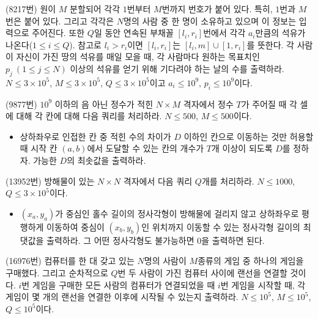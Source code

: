 \begin{problem}
    (8217번) 원이 $M$ 분할되어 각각 $1$번부터 $M$번까지 번호가 붙어 있다. 특히, $1$번과 $M$번은 붙어 있다. 그리고 각각은 $N$명의 사람 중 한 명이 소유하고 있으며 이 정보는 입력으로 주어진다. 또한 $Q$일 동안 연속된 부채꼴 $[l_i, r_i]$번에서 각각 $a_i$만큼의 석유가 나온다($1 \leq i \leq Q$). 참고로 $l_i > r_i$이면 $[l_i, r_i]$는 $[l_i, m] \cup [1, r_i]$를 뜻한다. 각 사람이 자신이 가진 땅의 석유를 매일 모을 때, 각 사람마다 원하는 목표치인 $p_j~(1 \leq j \leq N)$ 이상의 석유를 얻기 위해 기다려야 하는 날의 수를 출력하라. $N \leq 3 \times 10^5$, $M \leq 3 \times 10^5$, $Q \leq 3 \times 10^5$이고 $a_i \leq 10^9$, $p_i \leq 10^9$이다.
\end{problem}

\begin{problem}
    (9877번) $10^9$ 이하의 음 아닌 정수가 적힌 $N \times M$ 격자에서 정수 $T$가 주어질 때 각 셀에 대해 각 칸에 대해 다음 쿼리를 처리하라. $N \leq 500$, $M \leq 500$이다.
    \begin{itemize}
        \item 상하좌우로 인접한 칸 중 적힌 수의 차이가 $D$ 이하인 칸으로 이동하는 것만 허용할 때 시작 칸 $(a, b)$에서 도달할 수 있는 칸의 개수가 $T$개 이상이 되도록 $D$를 정하자. 가능한 $D$의 최솟값을 출력하라.
    \end{itemize}
\end{problem}

\begin{problem}
    (13952번) 방해물이 있는 $N \times N$ 격자에서 다음 쿼리 $Q$개를 처리하라. $N \leq 1000$, $Q \leq 3 \times 10^5$이다.
    \begin{itemize}
        \item $(x_a, y_a)$가 중심인 홀수 길이의 정사각형이 방해물에 걸리지 않고 상하좌우로 평행하게 이동하여 중심이 $(x_b, y_b)$인 위치까지 이동할 수 있는 정사각형 길이의 최댓값을 출력하라. 그 어떤 정사각형도 불가능하면 $0$을 출력하면 된다.
    \end{itemize}
\end{problem}

\begin{problem}
    (16976번) 컴퓨터를 한 대 갖고 있는 $N$명의 사람이 $M$종류의 게임 중 하나의 게임을 구매했다. 그리고 순차적으로 $Q$번 두 사람이 가진 컴퓨터 사이에 랜선을 연결할 것이다. $i$번 게임을 구매한 모든 사람의 컴퓨터가 연결되었을 때 $i$번 게임을 시작할 때, 각 게임이 몇 개의 랜선을 연결한 이후에 시작될 수 있는지 출력하라. $N \leq 10^5$, $M \leq 10^5$, $Q \leq 10^5$이다.
\end{problem}

